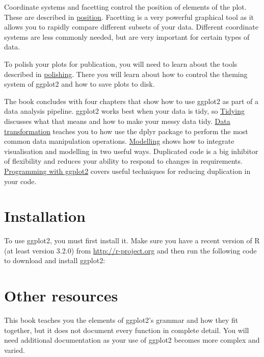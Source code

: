Coordinate systems and facetting control the position of elements of the
plot. These are described in \hyperref[cha:position]{position}.
Facetting is a very powerful graphical tool as it allows you to rapidly
compare different subsets of your data. Different coordinate systems are
less commonly needed, but are very important for certain types of data.

To polish your plots for publication, you will need to learn about the
tools described in \hyperref[cha:polishing]{polishing}. There you will
learn about how to control the theming system of ggplot2 and how to save
plots to disk.

The book concludes with four chapters that show how to use ggplot2 as
part of a data analysis pipeline. ggplot2 works best when your data is
tidy, so \hyperref[cha:data]{Tidying} discusses what that means and how
to make your messy data tidy. \hyperref[cha:dplyr]{Data transformation}
teaches you to how use the dplyr package to perform the most common data
manipulation operations. \hyperref[cha:modelling]{Modelling} shows how
to integrate visualisation and modelling in two useful ways. Duplicated
code is a big inhibitor of flexibility and reduces your ability to
respond to changes in requirements.
\hyperref[cha:programming]{Programming with ggplot2} covers useful
techniques for reducing duplication in your code.

\section{Installation}\label{sec:installation}


To use ggplot2, you must first install it. Make sure you have a recent
version of R (at least version 3.2.0) from \url{http://r-project.org}
and then run the following code to download and install ggplot2:

\begin{Shaded}
\begin{Highlighting}[]
\NormalTok{(}\NormalTok{)}
\end{Highlighting}
\end{Shaded}

\section{Other resources}\label{sec:other-resources}

This book teaches you the elements of ggplot2's grammar and how they fit
together, but it does not document every function in complete detail.
You will need additional documentation as your use of ggplot2 becomes
more complex and varied.

